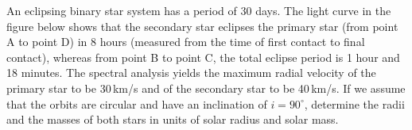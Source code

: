 An eclipsing binary star system has a period of 30 days. The light curve in
the figure below shows that the secondary star eclipses the primary star
(from point A to point D) in 8 hours (measured from the time of first contact
to final contact), whereas from point B to point C, the total eclipse period
is 1 hour and 18 minutes. The spectral analysis yields the maximum radial
velocity of the primary star to be 30\,km/s and of the secondary star to be
40\,km/s. If we assume that the orbits are circular and have an inclination
of $i = 90^\circ$, determine the radii and the masses of both stars in units
of solar radius and solar mass.
